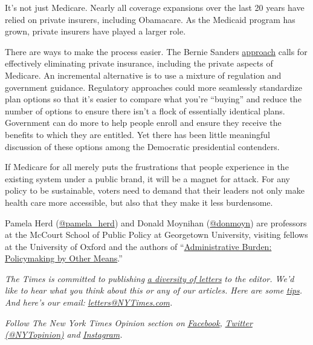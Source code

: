 It's not just Medicare. Nearly all coverage expansions over the last 20
years have relied on private insurers, including Obamacare. As the
Medicaid program has grown, private insurers have played a larger role.

There are ways to make the process easier. The Bernie Sanders
\href{https://www.nytimes3xbfgragh.onion/2019/03/23/health/private-health-insurance-medicare-for-all-bernie-sanders.html}{approach}
calls for effectively eliminating private insurance, including the
private aspects of Medicare. An incremental alternative is to use a
mixture of regulation and government guidance. Regulatory approaches
could more seamlessly standardize plan options so that it's easier to
compare what you're ``buying'' and reduce the number of options to
ensure there isn't a flock of essentially identical plans. Government
can do more to help people enroll and ensure they receive the benefits
to which they are entitled. Yet there has been little meaningful
discussion of these options among the Democratic presidential
contenders.

If Medicare for all merely puts the frustrations that people experience
in the existing system under a public brand, it will be a magnet for
attack. For any policy to be sustainable, voters need to demand that
their leaders not only make health care more accessible, but also that
they make it less burdensome.

Pamela Herd
(\href{https://twitter.com/pamela_herd?lang=en}{@pamela\_herd}) and
Donald Moynihan
(\href{https://twitter.com/donmoyn?ref_src=twsrc\%5Egoogle\%7Ctwcamp\%5Eserp\%7Ctwgr\%5Eauthor}{@donmoyn})
are professors at the McCourt School of Public Policy at Georgetown
University, visiting fellows at the University of Oxford and the authors
of
``\href{https://www.russellsage.org/publications/administrative-burden}{Administrative
Burden: Policymaking by Other Means}.''

\emph{The Times is committed to publishing}
\href{https://www.nytimes3xbfgragh.onion/2019/01/31/opinion/letters/letters-to-editor-new-york-times-women.html}{\emph{a
diversity of letters}} \emph{to the editor. We'd like to hear what you
think about this or any of our articles. Here are some}
\href{https://help.nytimes3xbfgragh.onion/hc/en-us/articles/115014925288-How-to-submit-a-letter-to-the-editor}{\emph{tips}}\emph{.
And here's our email:}
\href{mailto:letters@NYTimes.com}{\emph{letters@NYTimes.com}}\emph{.}

\emph{Follow The New York Times Opinion section on}
\href{https://www.facebookcorewwwi.onion/nytopinion}{\emph{Facebook}}\emph{,}
\href{http://twitter.com/NYTOpinion}{\emph{Twitter (@NYTopinion)}}
\emph{and}
\href{https://www.instagram.com/nytopinion/}{\emph{Instagram}}\emph{.}

